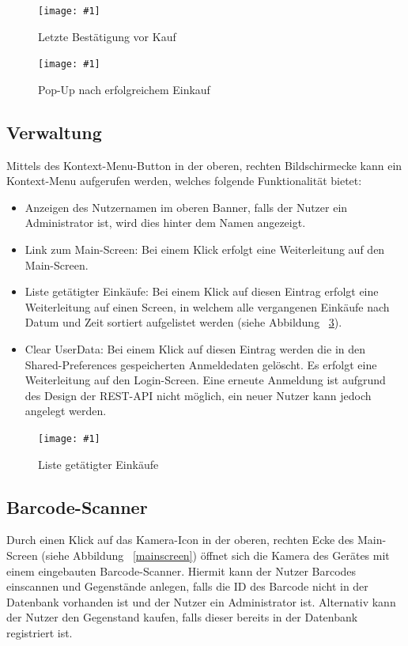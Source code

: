 \documentclass{scrartcl}
\newcommand{\cfigure}[3]{%
\begin{figure}[ht]
	\centering
	\texttt{[image: \#1]}
	\caption{#2}{#3} %
\end{figure}
}
\begin{document}
	\cfigure{figures/placeholder.png}{Letzte Bestätigung vor Kauf}{\label{shoppingCartCheck}}

	\cfigure{figures/placeholder.png}{Pop-Up nach erfolgreichem Einkauf}{\label{purchaseSuccess}}

	\subsection{Verwaltung}\label{subsec:verwaltung}

	Mittels des Kontext-Menu-Button in der oberen, rechten Bildschirmecke kann ein Kontext-Menu aufgerufen werden, welches folgende Funktionalität bietet:

	\begin{itemize}
		\item Anzeigen des Nutzernamen im oberen Banner, falls der Nutzer ein Administrator ist, wird dies hinter dem Namen angezeigt.

		\item Link zum Main-Screen: Bei einem Klick erfolgt eine Weiterleitung auf den Main-Screen.

		\item Liste getätigter Einkäufe: Bei einem Klick auf diesen Eintrag erfolgt eine Weiterleitung auf einen Screen, in welchem alle vergangenen Einkäufe nach Datum und Zeit sortiert aufgelistet werden (siehe Abbildung ~\ref{purchases}).

		\item Clear UserData: Bei einem Klick auf diesen Eintrag werden die in den Shared-Preferences gespeicherten Anmeldedaten gelöscht.
		Es erfolgt eine Weiterleitung auf den Login-Screen.
		Eine erneute Anmeldung ist aufgrund des Design der REST-API nicht möglich, ein neuer Nutzer kann jedoch angelegt werden.
	\end{itemize}

	\cfigure{figures/placeholder.png}{Liste getätigter Einkäufe}{\label{purchases}}

	\subsection{Barcode-Scanner}\label{subsec:barcode-scanner}

	Durch einen Klick auf das Kamera-Icon in der oberen, rechten Ecke des Main-Screen (siehe Abbildung ~\ref{mainscreen}) öffnet sich die Kamera des Gerätes mit einem eingebauten Barcode-Scanner.
	Hiermit kann der Nutzer Barcodes einscannen und Gegenstände anlegen, falls die ID des Barcode nicht in der Datenbank vorhanden ist und der Nutzer ein Administrator ist.
	Alternativ kann der Nutzer den Gegenstand kaufen, falls dieser bereits in der Datenbank registriert ist.
\end{document}
